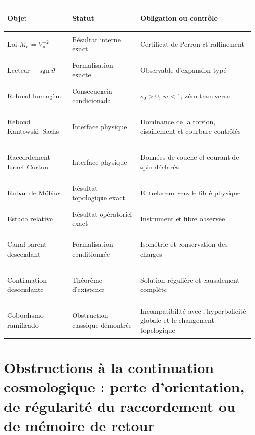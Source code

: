 \begin{center}
\small
\begin{tabularx}{\textwidth}{>{\bfseries\raggedright\arraybackslash}p{31mm}YY}
\toprule
Objet & Statut & Obligation ou contrôle\\
\midrule
Loi \(M_n=V_n^{-2}\) & Résultat interne exact & Certificat de Perron et raffinement\\
Lecteur \(-\operatorname{sgn}\vartheta\) & Formalisation exacte & Observable d'expansion typé\\
Rebond homogène & Consecuencia condicionada & \(s_0>0\), \(w<1\), zéro transverse\\
Rebond Kantowski--Sachs & Interface physique & Dominance de la torsion, cisaillement et courbure contrôlés\\
Raccordement Israel--Cartan & Interface physique & Données de couche et courant de spin déclarés\\
Ruban de Möbius & Résultat topologique exact & Entrelaceur vers le fibré physique\\
Estado relativo & Résultat opératoriel exact & Instrument et fibre observée\\
Canal parent--descendant & Formalisation conditionnée & Isométrie et conservation des charges\\
Continuation descendante & Théorème d'existence & Solution régulière et causalement complète\\
Cobordismo ramificado & Obstruction classique démontrée & Incompatibilité avec l'hyperbolicité globale et le changement topologique\\
\bottomrule
\end{tabularx}
\end{center}

\section{Obstructions à la continuation cosmologique : perte d'orientation, de régularité du raccordement ou de mémoire de retour}

